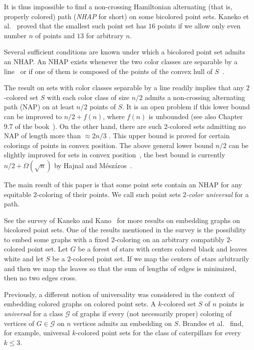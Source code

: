 \documentclass[12pt]{article}
\begin{document}
It is thus impossible to find a non-crossing Hamiltonian alternating (that is, properly colored) path (\emph{NHAP} for short) 
on some bicolored point sets. Kaneko et al.~\cite{kanekokanosuzuki} proved that the smallest such point set 
has $16$ points if we allow only even number $n$ of points and $13$ for arbitrary $n$. 

Several sufficient conditions are known under which a bicolored point set admits an NHAP. An NHAP exists whenever
the two color classes are separable by a line~\cite{abellanas99} or if one of them is composed of 
the points of the convex hull of $S$~\cite{abellanas99}.

The result on sets with color classes separable by a line readily implies that any $2$-colored 
set $S$ with each color class of size $n/2$ admits a non-crossing alternating path (NAP) on at least $n/2$ 
points of $S$. It is an open problem if this lower bound can be improved to $n/2+f(n)$, where $f(n)$
is unbounded (see also Chapter 9.7 of the book~\cite{brassmoserpach}). 
On the other hand, there are such $2$-colored sets admitting no NAP of length more than $\approx2n/3$
\cite{abellanas03,kynclpt}.
This upper bound is proved for certain colorings of points in convex position. The above
general lower bound $n/2$ can be slightly improved for sets in convex position~\cite{kynclpt, hajnalmeszaros}, 
the best bound is currently $n/2+\Omega(\sqrt{n})$ by Hajnal and M\'esz\'aros~\cite{hajnalmeszaros}.


The main result of this paper is that some point sets contain an NHAP for any equitable 
$2$-coloring of their points. We call such point sets \emph{$2$-color universal} for a path.

See the survey of Kaneko and Kano~\cite{kanekokano} for more results on embedding graphs on bicolored point sets.
One of the results mentioned in the survey is the possibility to embed some graphs with a fixed $2$-coloring on
an arbitrary compatibly $2$-colored point set. Let $G$ be a forest of stars with centers colored black and 
leaves white and let $S$ be a $2$-colored point set. If we map the centers of stars arbitrarily and then 
we map the leaves so that the sum of lengths of edges is minimized, then no two edges cross.

Previously, a different notion of universality was considered in the context of embedding colored graphs 
on colored point sets. A $k$-colored set $S$ of $n$ points is \emph{universal} for a class $\mathcal G$ 
of graphs if every (not necessarily proper) coloring of vertices of $G\in \mathcal G$ on $n$ vertices 
admits an embedding on $S$. Brandes et al.~\cite{brandes10+} find, for example, universal $k$-colored 
point sets for the class of caterpillars for every $k \leq 3$.
\end{document}
